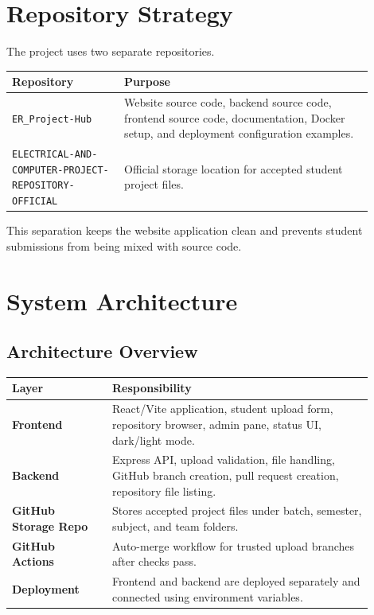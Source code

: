 \documentclass[12pt,a4paper]{article}
\begin{document}
\section{Repository Strategy}

The project uses two separate repositories.

\begin{longtable}{p{0.28\linewidth} p{0.62\linewidth}}
\toprule
\textbf{Repository} & \textbf{Purpose} \\
\midrule
\texttt{ER\_Project-Hub} & Website source code, backend source code, frontend source code, documentation, Docker setup, and deployment configuration examples. \\
\texttt{ELECTRICAL-AND-COMPUTER-PROJECT-REPOSITORY-OFFICIAL} & Official storage location for accepted student project files. \\
\bottomrule
\end{longtable}

This separation keeps the website application clean and prevents student submissions from being mixed with source code.

\section{System Architecture}

\subsection{Architecture Overview}

\begin{center}
\begin{tabular}{>{\bfseries}p{0.25\linewidth} p{0.65\linewidth}}
\toprule
Layer & Responsibility \\
\midrule
Frontend & React/Vite application, student upload form, repository browser, admin pane, status UI, dark/light mode. \\
Backend & Express API, upload validation, file handling, GitHub branch creation, pull request creation, repository file listing. \\
GitHub Storage Repo & Stores accepted project files under batch, semester, subject, and team folders. \\
GitHub Actions & Auto-merge workflow for trusted upload branches after checks pass. \\
Deployment & Frontend and backend are deployed separately and connected using environment variables. \\
\bottomrule
\end{tabular}
\end{center}
\end{document}
